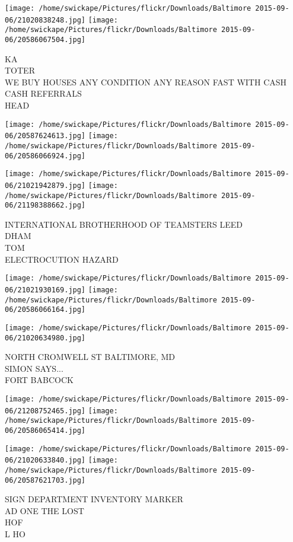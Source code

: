 \documentclass[10pt,letterpaper]{article}
\begin{document}
\texttt{[image: /home/swickape/Pictures/flickr/Downloads/Baltimore 2015-09-06/21020838248.jpg]}
\texttt{[image: /home/swickape/Pictures/flickr/Downloads/Baltimore 2015-09-06/20586067504.jpg]}

KA\\
TOTER\\
WE BUY HOUSES ANY CONDITION ANY REASON FAST WITH CASH CASH REFERRALS\\
HEAD
\pagebreak

\texttt{[image: /home/swickape/Pictures/flickr/Downloads/Baltimore 2015-09-06/20587624613.jpg]}
\texttt{[image: /home/swickape/Pictures/flickr/Downloads/Baltimore 2015-09-06/20586066924.jpg]}

\texttt{[image: /home/swickape/Pictures/flickr/Downloads/Baltimore 2015-09-06/21021942879.jpg]}
\texttt{[image: /home/swickape/Pictures/flickr/Downloads/Baltimore 2015-09-06/21198388662.jpg]}

INTERNATIONAL BROTHERHOOD OF TEAMSTERS LEED\\
DHAM\\
TOM\\
ELECTROCUTION HAZARD
\pagebreak

\texttt{[image: /home/swickape/Pictures/flickr/Downloads/Baltimore 2015-09-06/21021930169.jpg]}
\texttt{[image: /home/swickape/Pictures/flickr/Downloads/Baltimore 2015-09-06/20586066164.jpg]}

\vspace{0.25in}
\texttt{[image: /home/swickape/Pictures/flickr/Downloads/Baltimore 2015-09-06/21020634980.jpg]}

NORTH CROMWELL ST BALTIMORE, MD\\
SIMON SAYS...\\
FORT BABCOCK
\pagebreak

\texttt{[image: /home/swickape/Pictures/flickr/Downloads/Baltimore 2015-09-06/21208752465.jpg]}
\texttt{[image: /home/swickape/Pictures/flickr/Downloads/Baltimore 2015-09-06/20586065414.jpg]}

\texttt{[image: /home/swickape/Pictures/flickr/Downloads/Baltimore 2015-09-06/21020633840.jpg]}
\texttt{[image: /home/swickape/Pictures/flickr/Downloads/Baltimore 2015-09-06/20587621703.jpg]}

SIGN DEPARTMENT INVENTORY MARKER\\
AD ONE THE LOST\\
HOF\\
L HO
\pagebreak
\end{document}
